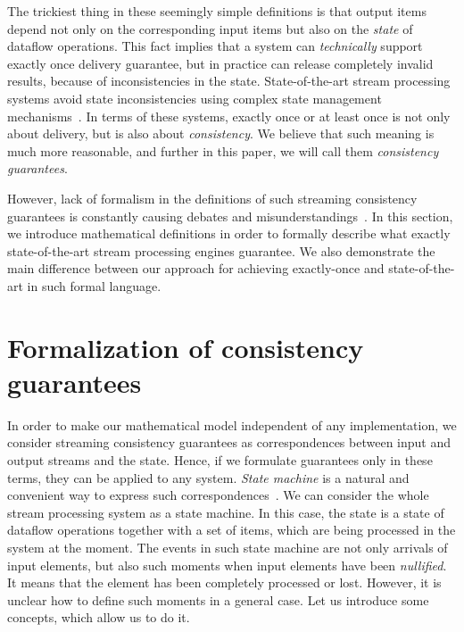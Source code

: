 \documentclass[sigconf]{acmart}
\theoremstyle{remark}
\begin{document}
The trickiest thing in these seemingly simple definitions is that output items depend not only on the corresponding input items but also on the {\em state} of dataflow operations. This fact implies that a system can {\em technically} support exactly once delivery guarantee, but in practice can release completely invalid results, because of inconsistencies in the state. State-of-the-art stream processing systems avoid state inconsistencies using complex state management mechanisms~\cite{Carbone:2017:SMA:3137765.3137777}. In terms of these systems, exactly once or at least once is not only about delivery, but is also about {\em consistency}. We believe that such meaning is much more reasonable, and further in this paper, we will call them {\em consistency guarantees}.   

However, lack of formalism in the definitions of such streaming consistency guarantees is constantly causing debates and misunderstandings~\cite{JerryPengStreamIO, PaperTrail}. In this section, we introduce mathematical definitions in order to formally describe what exactly state-of-the-art stream processing engines guarantee. We also demonstrate the main difference between our approach for achieving exactly-once and state-of-the-art in such formal language.     

\section{Formalization of consistency guarantees}

In order to make our mathematical model independent of any implementation, we consider streaming consistency guarantees as correspondences between input and output streams and the state. Hence, if we formulate guarantees only in these terms, they can be applied to any system. {\em State machine} is a natural and convenient way to express such correspondences~\cite{ссыль}. We can consider the whole stream processing system as a state machine. In this case, the state is a state of dataflow operations together with a set of items, which are being processed in the system at the moment. The events in such state machine are not only arrivals of input elements, but also such moments when input elements have been {\em nullified}. It means that the element has been completely processed or lost. However, it is unclear how to define such moments in a general case. Let us introduce some concepts, which allow us to do it.
\end{document}
